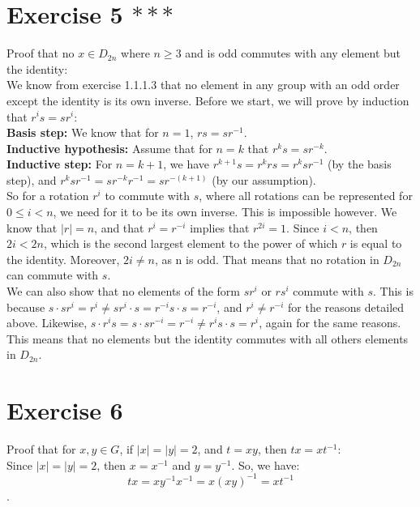 \documentclass{article}
\begin{document}
    \section*{Exercise 5 $***$}
    Proof that no $x \in D_{2n}$ where $n \geqslant 3$ and is odd
    commutes with any element but the identity: \\
    We know from exercise 1.1.1.3 that no element in any group with
    an odd order except the identity is its own inverse.
    Before we start, we will prove by induction that $r^is = sr^i$: \\
    \textbf{Basis step:}
    We know that for $n = 1$, $rs = sr^{-1}$. \\
    \textbf{Inductive hypothesis:}
    Assume that for $n = k$ that $r^ks = sr^{-k}$. \\
    \textbf{Inductive step:}
    For $n = k + 1$,
    we have $r^{k+1}s = r^krs = r^ksr^{-1}$ (by the basis step),
    and $r^ksr^{-1} = sr^{-k}r^{-1} = sr^{-(k+1)}$ (by our assumption). \\
    So for a rotation $r^i$ to commute with $s$,
    where all rotations can be represented for $0 \leqslant i < n$,
    we need for it to be its own inverse.
    This is impossible however.
    We know that $|r| = n$, 
    and that $r^i = r^{-i}$ implies that $r^{2i} = 1$.
    Since $i < n$,
    then $2i < 2n$, which is the second largest element to the power of
    which $r$ is equal to the identity.
    Moreover, $2i \neq n$, as n is odd.
    That means that no rotation in $D_{2n}$ can commute with $s$. \\
    We can also show that no elements of the form $sr^i$ or $rs^i$
    commute with $s$.
    This is because $s \cdot sr^i = r^i
    \neq sr^i \cdot s
    = r^{-i}s \cdot s
    = r^{-i}$,
    and $r^i \neq r^{-i}$ for the reasons detailed above.
    Likewise, $s \cdot r^is = s \cdot sr^{-i}
    = r^{-i}
    \neq r^is \cdot s
    = r^i$,
    again for the same reasons.
    This means that no elements but the identity commutes with all others
    elements in $D_{2n}$.


    \section*{Exercise 6}
    Proof that for $x, y \in G$, if $|x| = |y| = 2$, and $t = xy$,
    then $tx = xt^{-1}$: \\
    Since $|x| = |y| = 2$,
    then $x = x^{-1}$ and $y = y^{-1}$.
    So, we have:
    \[tx = xy^{-1}x^{-1} = x(xy)^{-1} = xt^{-1}\].
\end{document}
